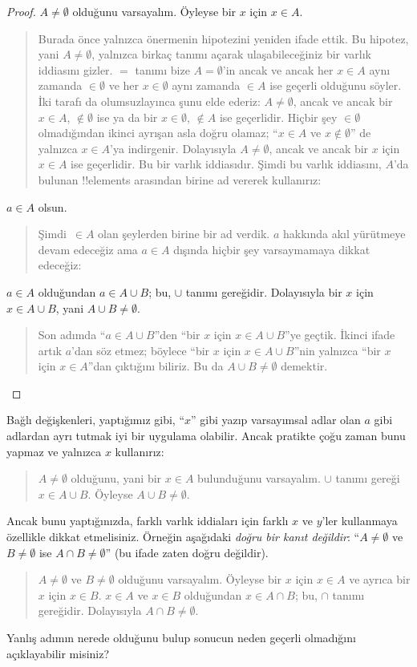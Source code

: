 \begin{proof}
  $A \neq \emptyset$ olduğunu varsayalım. Öyleyse bir $x$ için $x \in A$.
  \begin{quote}
    Burada önce yalnızca önermenin hipotezini yeniden ifade ettik. Bu
    hipotez, yani $A \neq \emptyset$, yalnızca birkaç tanımı açarak
    ulaşabileceğiniz bir varlık iddiasını gizler. $=$ tanımı bize $A =
    \emptyset$'in ancak ve ancak her $x \in A$ aynı zamanda $\in
    \emptyset$ ve her $x \in \emptyset$ aynı zamanda $\in A$ ise geçerli
    olduğunu söyler. İki tarafı da olumsuzlayınca şunu elde ederiz: $A
    \neq \emptyset$, ancak ve ancak bir $x \in A$, $\notin \emptyset$
    ise ya da bir $x \in \emptyset$, $\notin A$ ise geçerlidir. Hiçbir
    şey $\in \emptyset$ olmadığından ikinci ayrışan asla doğru olamaz;
    ``$x \in A$ ve $x \notin \emptyset$'' de yalnızca $x \in A$'ya
    indirgenir. Dolayısıyla $A \neq \emptyset$, ancak ve ancak bir $x$
    için $x \in A$ ise geçerlidir. Bu bir varlık iddiasıdır. Şimdi bu
    varlık iddiasını, $A$'da bulunan !!{element}s arasından birine ad vererek kullanırız:
  \end{quote}
  $a \in A$ olsun.
  \begin{quote}
    Şimdi~$\in A$ olan şeylerden birine bir ad verdik. $a$ hakkında
    akıl yürütmeye devam edeceğiz ama $a \in A$ dışında hiçbir şey
    varsaymamaya dikkat edeceğiz:
  \end{quote}
  $a \in A$ olduğundan $a \in A \cup B$; bu, $\cup$ tanımı gereğidir.
  Dolayısıyla bir $x$ için $x \in A \cup B$, yani $A \cup B \neq
  \emptyset$.
  \begin{quote}
    Son adımda ``$a \in A \cup B$''den ``bir $x$ için $x \in A \cup
    B$''ye geçtik. İkinci ifade artık $a$'dan söz etmez; böylece ``bir
    $x$ için $x \in A \cup B$''nin yalnızca ``bir $x$ için $x \in A$''dan
    çıktığını biliriz. Bu da $A \cup B \neq \emptyset$ demektir.
  \end{quote}
\end{proof}

Bağlı değişkenleri, yaptığımız gibi, ``$x$'' gibi yazıp varsayımsal
adlar olan $a$ gibi adlardan ayrı tutmak iyi bir uygulama olabilir.
Ancak pratikte çoğu zaman bunu yapmaz ve yalnızca $x$ kullanırız:
\begin{quote}
$A \neq \emptyset$ olduğunu, yani bir $x \in A$ bulunduğunu varsayalım.
$\cup$ tanımı gereği $x \in A \cup B$. Öyleyse $A \cup B \neq
\emptyset$.
\end{quote}
Ancak bunu yaptığınızda, farklı varlık iddiaları için farklı $x$ ve
$y$'ler kullanmaya özellikle dikkat etmelisiniz. Örneğin aşağıdaki
\emph{doğru bir kanıt değildir}: ``$A \neq \emptyset$ ve $B \neq
\emptyset$ ise $A \cap B \neq \emptyset$'' (bu ifade zaten doğru değildir).
\begin{quote}
$A \neq \emptyset$ ve $B \neq \emptyset$ olduğunu varsayalım. Öyleyse
bir $x$ için $x \in A$ ve ayrıca bir $x$ için $x \in B$. $x \in A$ ve
$x \in B$ olduğundan $x \in A \cap B$; bu, $\cap$ tanımı gereğidir.
Dolayısıyla $A \cap B \neq \emptyset$.
\end{quote}
Yanlış adımın nerede olduğunu bulup sonucun neden geçerli olmadığını
açıklayabilir misiniz?

